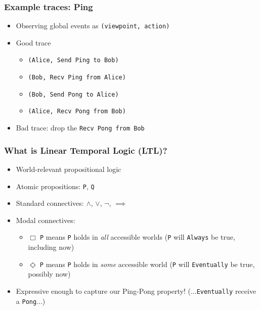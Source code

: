 \documentclass[12pt,aspectratio=169]{beamer}
\begin{document}
\begin{frame}
\frametitle{Example traces: Ping}
\begin{itemize}
  \item Observing global events as \texttt{(viewpoint, action)}
  \item Good trace
  \begin{itemize}
    \item \texttt{(Alice, Send Ping to Bob)}
    \item \texttt{(Bob, Recv Ping from Alice)}
    \item \texttt{(Bob, Send Pong to Alice)}
    \item \texttt{(Alice, Recv Pong from Bob)}
  \end{itemize}
  \item Bad trace: drop the \texttt{Recv Pong from Bob}
\end{itemize}
\end{frame}

\begin{frame}
\frametitle{What is Linear Temporal Logic (LTL)?}
\begin{itemize}
  \item World-relevant propositional logic
  \item Atomic propositions: \texttt{P}, \texttt{Q}
  \item Standard connectives: $\land$, $\lor$, $\neg$, $\implies$
  \item Modal connectives:
  \begin{itemize}
    \item $\Box$ \texttt{P} means \texttt{P} holds in \textit{all} accessible worlds
    \newline (\texttt{P} will \texttt{Always} be true, including now)
    \item $\Diamond$ \texttt{P} means \texttt{P} holds in \textit{some} accessible world
    \newline (\texttt{P} will \texttt{Eventually} be true, possibly now)
  \end{itemize}
  \item Expressive enough to capture our Ping-Pong property!
  \newline (...\texttt{Eventually} receive a \texttt{Pong}...)
\end{itemize}
\end{frame}
\end{document}
